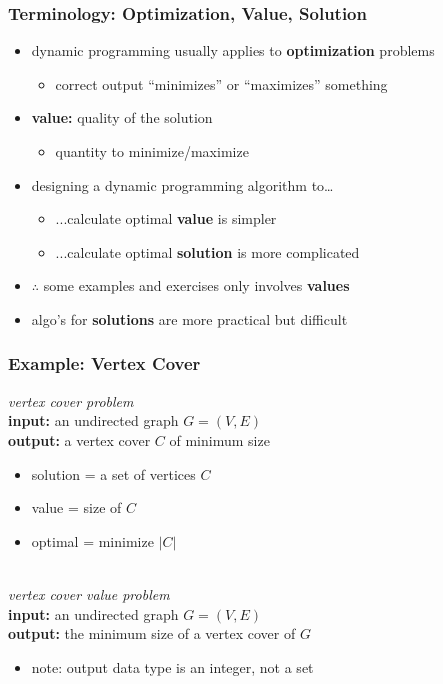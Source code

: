 \documentclass[10pt,aspectratio=169]{beamer}
\newcommand{\stanza}{ \\~\ }
\begin{document}
\begin{frame} \frametitle{Terminology: Optimization, Value, Solution}
\begin{itemize}
  \item dynamic programming usually applies to \textbf{optimization} problems
  \begin{itemize}
    \item correct output ``minimizes'' or ``maximizes'' something
  \end{itemize}
  \item \textbf{value:} quality of the solution
  \begin{itemize}
    \item quantity to minimize/maximize
  \end{itemize} 
  \item designing a dynamic programming algorithm to\dots
  \begin{itemize}
    \item ...calculate optimal \textbf{value} is simpler
    \item ...calculate optimal \textbf{solution} is more complicated
  \end{itemize}
  \item $\therefore$ some examples and exercises only involves \textbf{values}
  \item algo's for \textbf{solutions} are more practical but difficult
\end{itemize}
\end{frame}

\begin{frame} \frametitle{Example: Vertex Cover}
\emph{vertex cover problem} \\
\textbf{input:} an undirected graph $G=(V, E)$ \\
\textbf{output:} a vertex cover $C$ of minimum size
\begin{itemize}
  \item solution = a set of vertices $C$
  \item value = size of $C$
  \item optimal = minimize $|C|$ \stanza
\end{itemize}

\emph{vertex cover value problem} \\
\textbf{input:} an undirected graph $G=(V, E)$ \\
\textbf{output:} the minimum size of a vertex cover of $G$
\begin{itemize}
  \item note: output data type is an integer, not a set
\end{itemize}
\end{frame}
\end{document}
